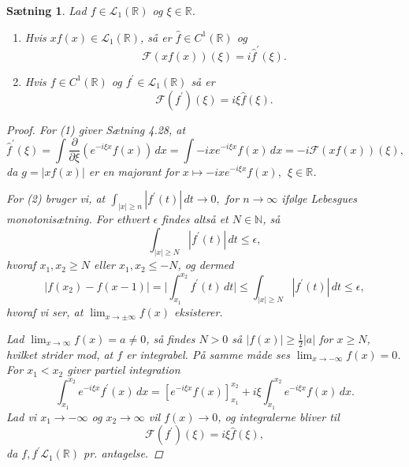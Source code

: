 \documentclass[12pt]{report}
\newtheorem{theorem}[lemma]{Sætning}
\theoremstyle{break}
\newtheorem*{proof}{Bevis}
\theoremstyle{break}
\newcommand{\RR}{\mathbb{R}}
\newcommand{\FI}{\mathcal{F}}
\renewcommand{\L}{\mathcal{L}}
\begin{document}
\begin{theorem}
Lad $f\in\L_1(\RR)$ og $\xi\in\RR$.
\begin{enumerate}
\item Hvis $xf(x)\in\L_1(\RR)$, så er $\hat{f}\in C^1(\RR)$ og \[\FI(xf(x))(\xi)=i\hat{f}^\prime(\xi).\]
\item Hvis $f\in C^1(\RR)$ og $f^\prime\in\L_1(\RR)$ så er \[\FI(f^\prime)(\xi)=i\xi\hat{f}(\xi).\]
\end{enumerate}
\begin{proof}
For (1) giver Sætning 4.28, at \[\hat{f}^\prime(\xi)=\int\frac{\partial}{\partial\xi}\left(e^{-i\xi x}f(x)\right)\,dx=\int -ixe^{-i\xi x}f(x)\,dx=-i\FI(xf(x))(\xi),\]
da $g=|xf(x)|$ er en majorant for $x\mapsto-ixe^{-i\xi x}f(x),~~\xi\in\RR$.

\bigskip

For (2) bruger vi, at $\int_{|x|\geq n}|f^\prime(t)|\, dt\to 0,$ for $n\to\infty$ ifølge Lebesgues monotonisætning. For ethvert $\epsilon$ findes altså et $N\in\mathbb{N}$, så
\[\int_{|x|\geq N}|f^\prime(t)|\, dt\leq\epsilon,\]
hvoraf $x_1,x_2\geq N$ eller $x_1,x_2\leq-N$, og dermed
\[|f(x_2)-f(x-1)|=\lvert\int_{x_1}^{x_2}f^\prime(t)\,dt\rvert\leq\int_{|x|\geq N}|f^\prime(t)|\, dt\leq\epsilon,\]
hvoraf vi ser, at $\lim_{x\to\pm\infty}f(x)$ eksisterer.

\bigskip

Lad $\lim_{x\to\infty}f(x)=a\neq 0$, så findes $N>0$ så $|f(x)|\geq\frac{1}{2}|a|$ for $x\geq N$, hvilket strider mod, at $f$ er integrabel. På samme måde ses $\lim_{x\to-\infty}f(x)=0$. For $x_1<x_2$ giver partiel integration
\[\int_{x_1}^{x_2}e^{-i\xi x}f^\prime(x)\,dx=[e^{-i\xi x}f(x)]_{x_1}^{x_2}+i\xi\int_{x_1}^{x_2}e^{-i\xi x}f(x)\,dx.\]
Lad vi $x_1\to-\infty$ og $x_2\to\infty$ vil $f(x)\to 0$, og integralerne bliver til
\[\FI(f^\prime)(\xi)=i\xi\hat{f}(\xi),\]
da $f,f^\prime\L_1(\RR)$ pr. antagelse.
\end{proof}
\end{theorem}

\newpage
\end{document}
